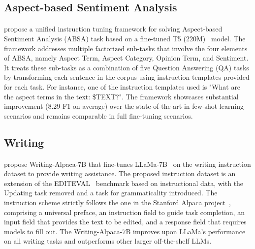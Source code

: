 \documentclass[11pt]{article}
\begin{document}
\subsection{Aspect-based Sentiment Analysis}
\paragraph{\citet{Varia2022InstructionTF}} propose a unified instruction tuning framework for solving Aspect-based Sentiment Analysis (ABSA) task based on a fine-tuned T5 (220M)~\citep{Raffel2019ExploringTL} model. The framework addresses multiple factorized sub-tasks that involve the four elements of ABSA, namely Aspect Term, Aspect Category, Opinion Term, and Sentiment. It treats these sub-tasks as a combination of five Question Answering (QA) tasks by transforming each sentence in the corpus using instruction templates provided for each task. For instance, one of the instruction templates used is "What are the aspect terms in the text: \$TEXT?". The framework showcases substantial improvement (8.29 F1 on average) over the state-of-the-art in few-shot learning scenarios and remains comparable in full fine-tuning scenarios.

\subsection{Writing}
\paragraph{\citet{Zhang2023MultiTaskIT}} propose Writing-Alpaca-7B that fine-tunes LLaMa-7B~\citep{peng2023instruction} on the writing  instruction dataset to provide writing assistance. The proposed instruction dataset is an extension of the EDITEVAL~\citep{dwivediyu2022editeval} benchmark based on instructional data, with the Updating task removed and a task for grammaticality introduced. The instruction scheme strictly follows the one in the Stanford Alpaca project~\citep{taori2023alpaca}, comprising a universal preface, an instruction field to guide task completion, an input field that provides the text to be edited, and a response field that requires models to fill out. The Writing-Alpaca-7B improves upon LLaMa’s performance on all writing tasks and outperforms other larger off-the-shelf LLMs.
\end{document}
